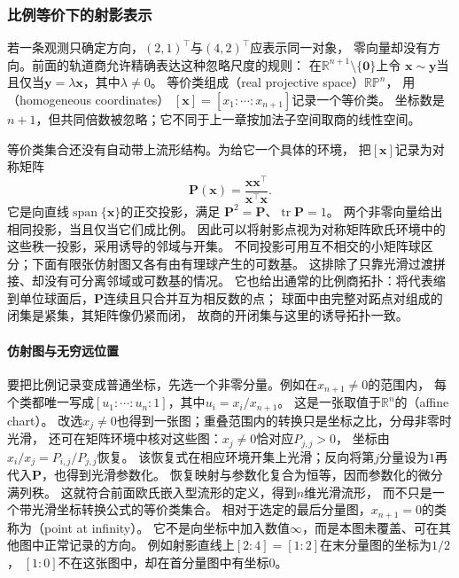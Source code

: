 \subsubsection{比例等价下的射影表示}
\label{sec:geometry-projective-representation}

若一条观测只确定方向，$(2,1)^\top$与$(4,2)^\top$应表示同一对象，
零向量却没有方向。前面的轨道商允许精确表达这种忽略尺度的规则：
在$\mathbb R^{n+1}\setminus\{\bm0\}$上令
$\bm x\sim\bm y$当且仅当$\bm y=\lambda\bm x$，其中$\lambda\ne0$。
等价类组成（real projective space）$\mathbb{RP}^n$，
用（homogeneous coordinates）
$[\bm x]=[x_1:\cdots:x_{n+1}]$记录一个等价类。
坐标数是$n+1$，但共同倍数被忽略；它不同于上一章按加法子空间取商的线性空间。

等价类集合还没有自动带上流形结构。为给它一个具体的环境，
把$[\bm x]$记录为对称矩阵
\[
 \bm P(\bm x)=\frac{\bm x\bm x^\top}{\bm x^\top\bm x}.
\]
它是向直线$\operatorname{span}\{\bm x\}$的正交投影，满足
$\bm P^2=\bm P$、$\operatorname{tr}\bm P=1$。
两个非零向量给出相同投影，当且仅当它们成比例。
因此可以将射影点视为对称矩阵欧氏环境中的这些秩一投影，采用诱导的邻域与开集。
不同投影可用互不相交的小矩阵球区分；下面有限张仿射图又各有由有理球产生的可数基。
这排除了只靠光滑过渡拼接、却没有可分离邻域或可数基的情况。
它也给出通常的比例商拓扑：将代表缩到单位球面后，$\bm P$连续且只合并互为相反数的点；
球面中由完整对跖点对组成的闭集是紧集，其矩阵像仍紧而闭，
故商的开闭集与这里的诱导拓扑一致。

\paragraph{仿射图与无穷远位置}
要把比例记录变成普通坐标，先选一个非零分量。例如在$x_{n+1}\ne0$的范围内，
每个类都唯一写成$[u_1:\cdots:u_n:1]$，其中$u_i=x_i/x_{n+1}$。
这是一张取值于$\mathbb R^n$的（affine chart）。
改选$x_j\ne0$也得到一张图；重叠范围内的转换只是坐标之比，分母非零时光滑，
还可在矩阵环境中核对这些图：$x_j\ne0$恰对应$P_{j,j}>0$，
坐标由$x_i/x_j=P_{i,j}/P_{j,j}$恢复。
该恢复式在相应环境开集上光滑；反向将第$j$分量设为$1$再代入$\bm P$，也得到光滑参数化。
恢复映射与参数化复合为恒等，因而参数化的微分满列秩。
这就符合前面欧氏嵌入型流形的定义，得到$n$维光滑流形，
而不只是一个带光滑坐标转换公式的等价类集合。
相对于选定的最后分量图，$x_{n+1}=0$的类称为（point at infinity）。
它不是向坐标中加入数值$\infty$，而是本图未覆盖、可在其他图中正常记录的方向。
例如射影直线上$[2:4]=[1:2]$在末分量图的坐标为$1/2$，
$[1:0]$不在这张图中，却在首分量图中有坐标$0$。

